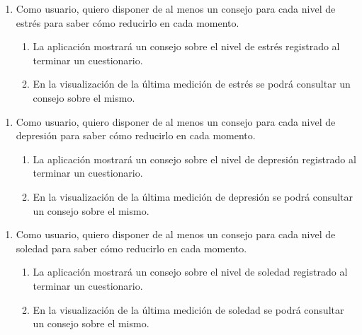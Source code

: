         \begin{enumerate}[resume=req-usuario,label=\textbf{\texttt{RU-\arabic*}}]
            \item \label{req:usuario:consejo_estres} Como usuario, quiero disponer de al menos un consejo para cada nivel de estrés para saber cómo reducirlo en cada momento.
            \begin{enumerate}[resume=req-funcionales,label=\textbf{\texttt{RF-\arabic*}}]
                \item \label{req:funcionales:consejo_cuestionario_estres} La aplicación mostrará un consejo sobre el nivel de estrés registrado al terminar un cuestionario.
                \item \label{req:funcionales:consejo_visualizacion_estres} En la visualización de la última medición de estrés se podrá consultar un consejo sobre el mismo. 
            \end{enumerate}
        \end{enumerate}
        \begin{enumerate}[resume=req-usuario,label=\textbf{\texttt{RU-\arabic*}}]
            \item \label{req:usuario:consejo_depresion} Como usuario, quiero disponer de al menos un consejo para cada nivel de depresión para saber cómo reducirlo en cada momento.
            \begin{enumerate}[resume=req-funcionales,label=\textbf{\texttt{RF-\arabic*}}]
                \item \label{req:funcionales:consejo_cuestionario_depresion} La aplicación mostrará un consejo sobre el nivel de depresión registrado al terminar un cuestionario.
                \item \label{req:funcionales:consejo_visualizacion_depresion} En la visualización de la última medición de depresión se podrá consultar un consejo sobre el mismo.
            \end{enumerate}
        \end{enumerate}
        \begin{enumerate}[resume=req-usuario,label=\textbf{\texttt{RU-\arabic*}}]
            \item \label{req:usuario:consejo_soledad} Como usuario, quiero disponer de al menos un consejo para cada nivel de soledad para saber cómo reducirlo en cada momento.
            \begin{enumerate}[resume=req-funcionales,label=\textbf{\texttt{RF-\arabic*}}]
                \item \label{req:funcionales:consejo_cuestionario_soledad} La aplicación mostrará un consejo sobre el nivel de soledad registrado al terminar un cuestionario.
                \item \label{req:funcionales:consejo_visualizacion_soledad} En la visualización de la última medición de soledad se podrá consultar un consejo sobre el mismo. 
            \end{enumerate}
        \end{enumerate}
